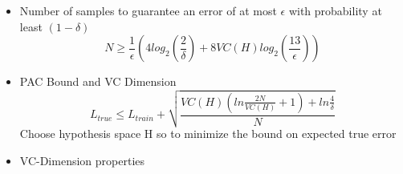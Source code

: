 \documentclass[12pt]{article} %
\begin{document}
\begin{itemize}
\item Number of samples to guarantee an error of at most $\epsilon$ with probability at least $(1-\delta)$
$$ N \geq \frac{1}{\epsilon} \left( 4log_2\left( \frac{2}{\delta}\right) + 8VC(H)log_2\left( \frac{13}{\epsilon}\right)\right)$$
\item PAC Bound and VC Dimension
$$ L_{true} \leq L_{train} + \sqrt{\frac{VC(H)\left( ln \frac{2N}{VC(H)} + 1 \right)+ ln \frac{4}{\delta}}{N}} $$
Choose hypothesis space H so to minimize the bound on expected true error

\item VC-Dimension properties
\begin{center}
\end{center}
\begin{center}
\end{center}
\end{itemize}
\end{document}
